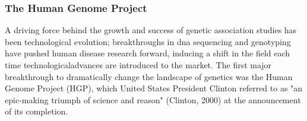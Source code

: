 



 





\subsubsection{The Human Genome Project}

\cite{lander2001initial}

A driving force behind the growth and success of genetic association studies has been technological evolution; breakthroughs in \gls{dna} sequencing and genotyping have pushed human disease research forward, inducing a shift in the field each time technologicaladvances are introduced to the market. 
The first major breakthrough to dramatically change the landscape of genetics was the Human Genome Project (HGP), which United States President Clinton referred to as "an epic-making triumph of science and reason" (Clinton, 2000) at the announcement of its completion.\\

